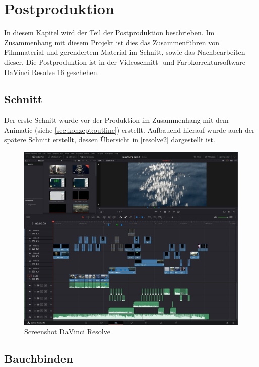 \chapter{Postproduktion}

In diesem Kapitel wird der Teil der Postproduktion beschrieben. Im Zusammenhang mit diesem Projekt ist dies das Zusammenführen von Filmmaterial und gerendertem Material im Schnitt, sowie das Nachbearbeiten dieser. Die Postproduktion ist in der Videoschnitt- und Farbkorrektursoftware DaVinci Resolve 16 geschehen.

\section{Schnitt}

Der erste Schnitt wurde vor der Produktion im Zusammenhang mit dem Animatic (siehe \autoref{sec:konzept:outline}) erstellt. Aufbauend hierauf wurde auch der spätere Schnitt erstellt, dessen Übersicht in \autoref{resolve2} dargestellt ist.

\begin{figure}[H]
\begin{center}
\includegraphics[width=\textwidth]{gfx/post/resolve2.jpg}
\caption{Screenshot DaVinci Resolve}
\label{resolve2}
\end{center}
\end{figure}

\section{Bauchbinden}
\label{sec:bauchbinden}

